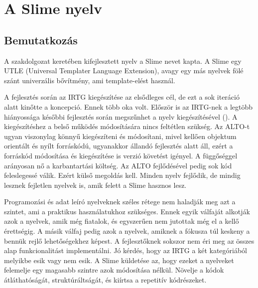 
\chapter{A Slime nyelv}
\label{sec:Slime}
\section{Bemutatkozás}
A szakdolgozat keretében kifejlesztett nyelv a Slime nevet kapta.
A Slime egy UTLE (Universal Templater Language Extension), 
avagy egy más nyelvek fölé szánt univerzális bővítmény, ami template-elést használ.

A fejlesztés során az IRTG kiegészítése az elsődleges cél, de ezt a sok iteráció alatt kinőtte a koncepció. 
Ennek több oka volt. 
Először is az IRTG-nek a legtöbb hiányossága későbbi fejlesztés során megszűnhet a nyelv kiegészítésével ().
A kiegészítéshez a belső működés módosítására nincs feltétlen szükség. 
Az ALTO-t ugyan viszonylag könnyű kiegészíteni és módosítani, mivel kellően objektum orientált és nyílt forráskódú,
ugyanakkor állandó fejlesztés alatt áll, ezért a forráskód módosítása és kiegészítése is verzió követést igényel. 
A függőséggel arányosan nő a karbantartási költség. 
Az ALTO fejlődésével pedig sok kód feleslegessé válik. 
Ezért külső megoldás kell. 
Minden nyelv fejlődik, de mindig lesznek fejletlen nyelvek is, amik felett a Slime hasznos lesz.

Programozási és adat leíró nyelveknek széles rétege nem haladják meg azt a szintet, ami a  praktikus használatukhoz szükséges. 
Ennek egyik válfaját alkotják azok a nyelvek, amik még fiatalok, és egyszerűen nem jutottak még el a kellő érettségig. 
A másik válfaj pedig azok a nyelvek, amiknek a fókusza túl keskeny a bennük rejlő lehetőségekhez képest.
A fejlesztőknek sokszor nem éri meg az összes alap funkcionalitást implementálni. 
Jó kérdés, hogy az IRTG a két kategóriából melyikbe esik vagy nem esik. 
A Slime küldetése az, hogy ezeket a nyelveket felemelje egy magasabb szintre azok módosítása nélkül. 
Növelje a kódok átláthatóságát, struktúráltságát, és kiírtsa a repetitív kódrészeket.

